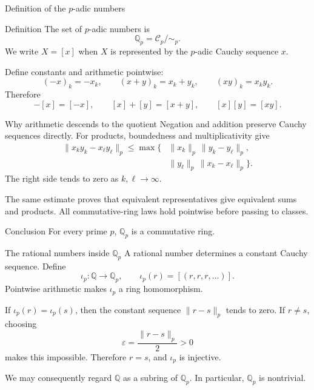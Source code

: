 \documentclass[aspectratio=169,11pt]{beamer}
\newcommand{\Q}{\mathbb Q}
\begin{document}
\begin{frame}{Definition of the \(p\)-adic numbers}
  \begin{block}{Definition}
    The set of \alert{\(p\)-adic numbers} is
    \[
      \boxed{\Q_p=\mathcal C_p/{\sim_p}.}
    \]
    We write \(X=[x]\) when \(X\) is represented by the \(p\)-adic Cauchy
    sequence \(x\).
  \end{block}

  Define constants and arithmetic pointwise:
  \[
    (-x)_k=-x_k,
    \qquad
    (x+y)_k=x_k+y_k,
    \qquad
    (xy)_k=x_ky_k.
  \]
  Therefore
  \[
    -[x]=[-x],
    \qquad
    [x]+[y]=[x+y],
    \qquad
    [x][y]=[xy].
  \]
\end{frame}

\begin{frame}{Why arithmetic descends to the quotient}
  Negation and addition preserve Cauchy sequences directly.  For products,
  boundedness and multiplicativity give
  \begin{align*}
    \|x_ky_k-x_\ell y_\ell\|_p
      \le\max\bigl\{
        &\|x_k\|_p\,\|y_k-y_\ell\|_p,\\
        &\|y_\ell\|_p\,\|x_k-x_\ell\|_p
        \bigr\}.
  \end{align*}
  The right side tends to zero as \(k,\ell\to\infty\).

  The same estimate proves that equivalent representatives give equivalent
  sums and products.  All commutative-ring laws hold pointwise before
  passing to classes.

  \begin{alertblock}{Conclusion}
    For every prime \(p\), \(\Q_p\) is a commutative ring.
  \end{alertblock}
\end{frame}

\begin{frame}{The rational numbers inside \(\Q_p\)}
  A rational number determines a constant Cauchy sequence.  Define
  \[
    \iota_p\colon\Q\longrightarrow\Q_p,
    \qquad
    \iota_p(r)=[(r,r,r,\ldots)].
  \]
  Pointwise arithmetic makes \(\iota_p\) a ring homomorphism.

  If \(\iota_p(r)=\iota_p(s)\), then the constant sequence
  \(\|r-s\|_p\) tends to zero.  If \(r\ne s\), choosing
  \[
    \varepsilon=\frac{\|r-s\|_p}{2}>0
  \]
  makes this impossible.  Therefore \(r=s\), and \(\iota_p\) is injective.

  We may consequently regard \(\Q\) as a subring of \(\Q_p\).  In
  particular, \(\Q_p\) is nontrivial.
\end{frame}
\end{document}
